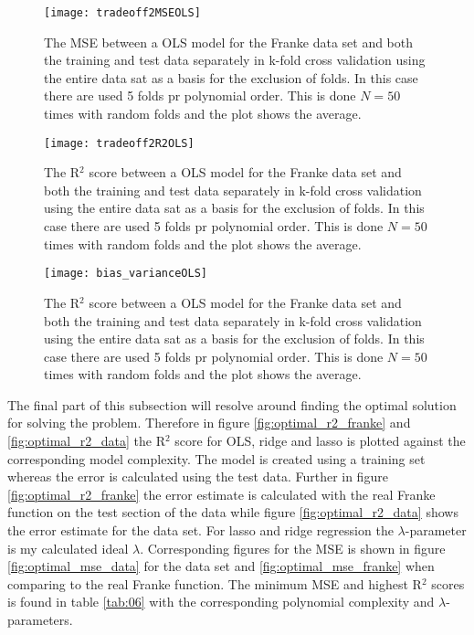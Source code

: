 \documentclass[uio,jmp,amsmath,amssymb,reprint,nofootinbib]{revtex4-1}
\numberwithin{equation}{section}
\begin{document}
\begin{figure}[H]
    \centering
    \texttt{[image: tradeoff2MSEOLS]}
    \caption{The MSE between a OLS model for the Franke data set and both the training and test data separately in k-fold cross validation using the entire data sat as a basis for the exclusion of folds. In this case there are used 5 folds pr polynomial order. This is done \(N=50\) times with random folds and the plot shows the average.}
    \label{fig:test_vs_train}
\end{figure}

\begin{figure}[H]
    \centering
    \texttt{[image: tradeoff2R2OLS]}
    \caption{The R\(^2\) score between a OLS model for the Franke data set and both the training and test data separately in k-fold cross validation using the entire data sat as a basis for the exclusion of folds. In this case there are used 5 folds pr polynomial order. This is done \(N=50\) times with random folds and the plot shows the average.}
    \label{fig:test_vs_trainR2}
\end{figure}


\begin{figure}[H]
    \centering
    \texttt{[image: bias\_varianceOLS]}
    \caption{The R\(^2\) score between a OLS model for the Franke data set and both the training and test data separately in k-fold cross validation using the entire data sat as a basis for the exclusion of folds. In this case there are used 5 folds pr polynomial order. This is done \(N=50\) times with random folds and the plot shows the average.}
    \label{fig:bias_varianceOLS}
\end{figure}

The final part of this subsection will resolve around finding the optimal solution for solving the problem. Therefore in figure \ref{fig:optimal_r2_franke} and \ref{fig:optimal_r2_data} the R\(^2\) score for OLS, ridge and lasso is plotted against the corresponding model complexity. The model is created using a training set whereas the error is calculated using the test data. Further in figure \ref{fig:optimal_r2_franke} the error estimate is calculated with the real Franke function on the test section of the data while figure \ref{fig:optimal_r2_data} shows the error estimate for the data set. For lasso and ridge regression the \(\lambda\)-parameter is my calculated ideal \(\lambda\). Corresponding figures for the MSE is shown in figure \ref{fig:optimal_mse_data} for the data set and \ref{fig:optimal_mse_franke} when comparing to the real Franke function. The minimum MSE and highest R\(^2\) scores is found in table \ref{tab:06} with the corresponding polynomial complexity and \(\lambda\)-parameters.
\end{document}
